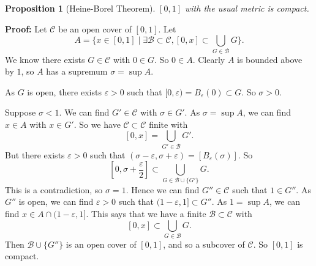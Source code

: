 \documentclass[12pt]{article}
\newtheorem{proposition}{Proposition}[section]
\theoremstyle{definition}
\theoremstyle{remark}
\begin{document}
\begin{proposition}[Heine-Borel Theorem]
	$[0, 1]$ with the usual metric is compact.
\end{proposition}

\begin{adjustbox}{minipage = \columnwidth - 25.5pt, margin=1em, frame=1pt, margin=0em}
	\textbf{Proof:} Let $\mathcal{C}$ be an open cover of $[0, 1]$. Let 
	\[
		A = \{x \in [0, 1] \mid \exists \mathcal{B} \subset \mathcal{C}, [0, x] \subset \bigcup_{G \in \mathcal{B}} G \}
	.\]
	We know there exists $G \in \mathcal{C}$ with $0 \in G$. So $0 \in A$. Clearly $A$ is bounded above by $1$, so $A$ has a supremum $\sigma = \sup A$.

	As $G$ is open, there exists $\varepsilon > 0$ such that $[0, \varepsilon) = B_{\varepsilon}(0) \subset G$. So $\sigma > 0$.

	Suppose $\sigma < 1$. We can find $G' \in \mathcal{C}$ with $\sigma \in G'$. As $\sigma = \sup A$, we can find $x \in A$ with $x \in G'$. So we have $\mathcal{C} \subset \mathcal{C}$ finite with
	 \[
		 [0, x] = \bigcup_{G' \in \mathcal{B}}G'
	.\]
	But there exists $\varepsilon > 0$ such that $(\sigma - \varepsilon, \sigma + \varepsilon) = [B_{\varepsilon}(\sigma)]$. So
	\[
		[0, \sigma + \frac{\varepsilon}{2}] \subset \bigcup_{G \in \mathcal{B} \cup \{G'\}}G
	.\]
	This is a contradiction, so $\sigma = 1$. Hence we can find $G'' \in \mathcal{C}$ such that $1 \in G''$. As $G''$ is open, we can find $\varepsilon > 0$ such that $(1 - \varepsilon, 1] \subset G''$. As $1 = \sup A$, we can find $x \in A \cap (1 - \varepsilon , 1]$. This says that we have a finite $\mathcal{B} \subset \mathcal{C}$ with
	 \[
		 [0, x] \subset \bigcup_{G \in \mathcal{B}}G
	.\]
	Then $\mathcal{B} \cup \{G''\}$ is an open cover of $[0, 1]$, and so a subcover of $\mathcal{C}$. So $[0, 1]$ is compact.
\end{adjustbox}



\newpage

\printindex
\end{document}
